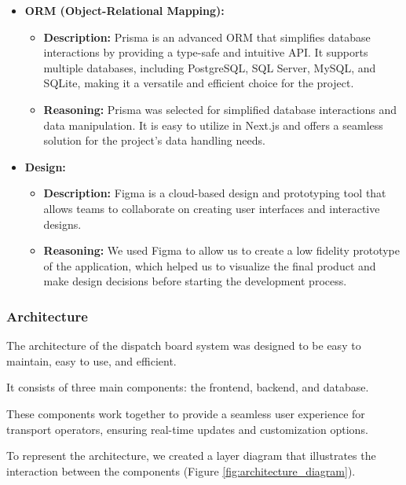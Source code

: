 \documentclass[10pt]{article}
\begin{document}
\begin{itemize}
                \item \textbf{ORM (Object-Relational Mapping):}
                \begin{itemize}
                    \item \textbf{Description:} Prisma is an advanced ORM that simplifies database interactions by providing a type-safe and intuitive API. It supports multiple databases, including PostgreSQL, SQL Server, MySQL, and SQLite, making it a versatile and efficient choice for the project.
                    \item \textbf{Reasoning:} Prisma was selected for simplified database interactions and data manipulation. It is easy to utilize in Next.js and offers a seamless solution for the project's data handling needs.
                \end{itemize}
                \item \textbf{Design:}
                \begin{itemize}
                    \item \textbf{Description:} Figma is a cloud-based design and prototyping tool that allows teams to collaborate on creating user interfaces and interactive designs.
                    \item \textbf{Reasoning:} We used Figma to allow us to create a low fidelity prototype of the application, which helped us to visualize the final product and make design decisions before starting the development process.
                \end{itemize}
        \end{itemize}


        \subsubsection{Architecture}
        The architecture of the dispatch board system was designed to be easy to maintain, easy to use, and efficient. 

        It consists of three main components: the frontend, backend, and database. 

        These components work together to provide a seamless user experience for transport operators, ensuring real-time updates and customization options. 
        
        To represent the architecture, we created a layer diagram that illustrates the interaction between the components (Figure \ref{fig:architecture_diagram}).
\end{document}
